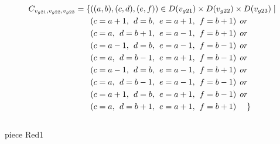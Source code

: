 \begin{align*}
C_{v_{g21},v_{g22},v_{g23}}=\{&((a,b),(c,d),(e,f))\in D(v_{g21})\times D(v_{g22})\times D(v_{g23})\mid\\
&(c = a+1,\hspace{1ex}d = b,\hspace{1ex}e = a+1, \hspace{1ex}f = b+1)\hspace{1ex} or\\
&(c = a,\hspace{1ex}d = b+1,\hspace{1ex}e = a-1, \hspace{1ex}f = b+1)\hspace{1ex} or\\
&(c = a-1,\hspace{1ex}d = b,\hspace{1ex}e = a-1,\hspace{1ex} f = b-1)\hspace{1ex} or\\
&(c = a,\hspace{1ex}d = b-1,\hspace{1ex}e = a+1, \hspace{1ex}f = b-1)\hspace{1ex} or\\
&(c = a-1,\hspace{1ex}d = b,\hspace{1ex}e = a-1, \hspace{1ex}f = b+1)\hspace{1ex} or\\
&(c = a,\hspace{1ex}d = b-1,\hspace{1ex}e = a-1, \hspace{1ex}f = b-1)\hspace{1ex} or\\
&(c = a+1,\hspace{1ex}d = b,\hspace{1ex}e = a+1, \hspace{1ex}f = b-1)\hspace{1ex} or\\
&(c = a,\hspace{1ex}d = b+1,\hspace{1ex}e = a+1, \hspace{1ex}f = b+1) \hspace{3ex} \}
\end{align*}
\\ piece Red1 

